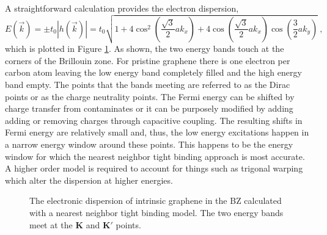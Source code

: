 A straightforward calculation provides the electron dispersion,
\begin{equation*}
	E(\vec{k})=\pm t_0 |h(\vec{k})|=t_0 \sqrt{1+4 \cos^2 \left(\frac{\sqrt{3}}{2} a k_x\right)
		+4 \cos\left(\frac{\sqrt{3}}{2} a k_x \right) \cos \left(\frac{3}{2} a k_y\right)} \ ,
\end{equation*}
which is plotted in Figure \ref{fig:TB:Dispersion}.
As shown, the two energy bands touch at the corners of the Brillouin zone.
For pristine graphene there is one electron per carbon atom leaving the low energy band completely filled and the high energy band empty.
The points that the bands meeting are referred to as the Dirac points or as the charge neutrality points.
The Fermi energy can be shifted by charge transfer from contaminates or it can be purposely modified by adding adding or removing charges through capacitive coupling.
The resulting shifts in Fermi energy are relatively small and, thus, the low energy excitations happen in a narrow energy window around these points.
This happens to be the energy window for which the nearest neighbor tight binding approach is most accurate.
A higher order model is required to account for things such as trigonal warping which alter the dispersion at higher energies.

\begin{figure}
	\begin{center}
	
	\end{center}
	\caption[The electronic dispersion of intrinsic graphene]{\label{fig:TB:Dispersion} The electronic dispersion of intrinsic graphene in the BZ calculated with a nearest neighbor tight binding model.  The two energy bands meet at the $\bm{K}$ and $\bm{K'}$ points.}	
\end{figure}

